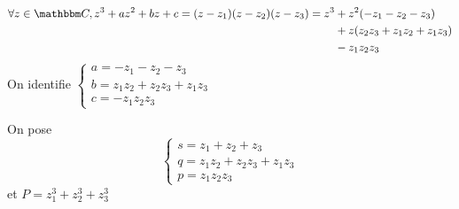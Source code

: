 \begin{prv}
	[\underline{\sc incomplète} pour $n=3$]
	\begin{align*}
		\forall z \in \C,
		z^3 + az^2 + bz+c = (z-z_1)(z-z_2)(z-z_3) = z^3 &+ z^2(-z_1 - z_2 - z_3)\\
																										&+z(z_2z_3 + z_1z_2+z_1z_3)\\
																										&-z_1z_2z_3
	\end{align*}
	On identifie $\begin{cases}
		a = -z_1-z_2-z_3\\
		b = z_1z_2+z_2z_3+z_1z_3\\
		c= -z_1z_2z_3
	\end{cases}$
\end{prv}

\begin{exm}
	On pose \[
		\begin{cases}
			s = z_1+z_2+z_3\\
			q = z_1z_2+z_2z_3+z_1z_3\\
			p = z_1z_2z_3
		\end{cases}
	\] et $P = z_1^3+z_2^3+z_3^3$
\end{exm}

